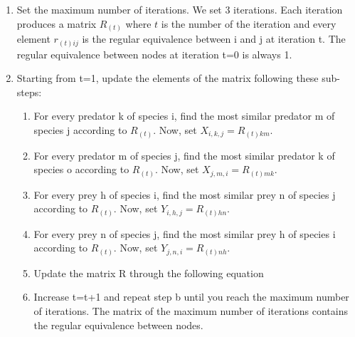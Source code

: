 \documentclass[twocolumn]{article}
\begin{document}
\begin{appendices}
\begin{enumerate}
				      \begin{enumerate}

					      \item Set the maximum number of iterations. We set 3 iterations. Each iteration produces a matrix $R_{\left(t\right)}$ where $t$ is the number of the iteration and every element $r_{\left(t\right)ij}$ is the regular equivalence between i and j at iteration t. The regular equivalence between nodes at iteration t=0 is always 1.

					      \item Starting from t=1, update the elements of the matrix following these sub-steps:

					            \begin{enumerate}
						            \item For every predator k of species i, find the most similar predator m of species j according to  $R_{\left(t\right)}$.
						                  Now, set $X_{i,k,j}=R_{\left(t\right)km}.$
						            \item For every predator m of species j, find the most similar predator k of species o according to $R_{\left(t\right)}$.
						                  Now, set $X_{j,m,i}=R_{\left(t\right)mk}$.
						            \item For every prey h of species i, find the most similar prey n of species j according to $R_{\left(t\right)}$.
						                  Now, set $Y_{i,h,j}=R_{\left(t\right)hn}$.
						            \item For every prey n of species j, find the most similar prey h of species i according to $R_{\left(t\right)}$.
						                  Now, set $Y_{j,n,i}=R_{\left(t\right)nh}$.
						            \item Update the matrix R through the following equation
						            \item Increase t=t+1 and repeat step b until you reach the maximum number of iterations. The matrix of the maximum number of iterations contains the regular equivalence between nodes.
					            \end{enumerate}


\end{enumerate}
\end{enumerate}
\end{appendices}
\end{document}
